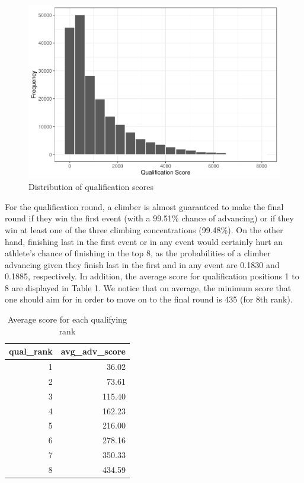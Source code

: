 \documentclass[12pt]{article}
\begin{document}
\begin{figure}
\centering
\includegraphics{draft_files/figure-latex/unnamed-chunk-4-1.pdf}
\caption{Distribution of qualification scores}
\end{figure}

For the qualification round, a climber is almost guaranteed to make the
final round if they win the first event (with a 99.51\% chance of
advancing) or if they win at least one of the three climbing
concentrations (99.48\%). On the other hand, finishing last in the first
event or in any event would certainly hurt an athlete's chance of
finishing in the top 8, as the probabilities of a climber advancing
given they finish last in the first and in any event are 0.1830 and
0.1885, respectively. In addition, the average score for qualification
positions 1 to 8 are displayed in Table 1. We notice that on average,
the minimum score that one should aim for in order to move on to the
final round is 435 (for 8th rank).

\begin{table}[ht]
\centering
\caption{Average score for each qualifying rank} 
\begin{tabular}{rr}
  \hline
qual\_rank & avg\_adv\_score \\ 
  \hline
  1 & 36.02 \\ 
    2 & 73.61 \\ 
    3 & 115.40 \\ 
    4 & 162.23 \\ 
    5 & 216.00 \\ 
    6 & 278.16 \\ 
    7 & 350.33 \\ 
    8 & 434.59 \\ 
   \hline
\end{tabular}
\end{table}
\end{document}
